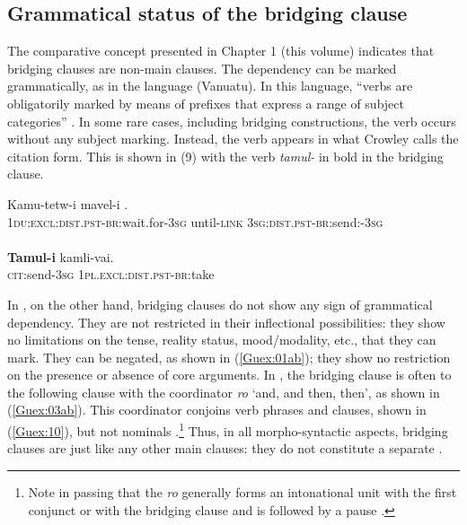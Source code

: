 \documentclass[output=paper]{LSP/langsci}
\begin{document}
\subsection{Grammatical status of the bridging clause} 
\label{Gusec:Status}
The comparative concept presented in Chapter 1 (this volume) indicates that bridging clauses are non-main clauses. The dependency can be marked grammatically, as in the  language  (Vanuatu). In this language, ``verbs are obligatorily marked by means of prefixes that express a range of subject categories'' \citep[][85]{crowley98}. In some rare cases, including bridging constructions, the verb occurs without any subject marking. Instead, the verb appears in what Crowley calls the citation form. This is shown in (9) with the verb \textit{tamul-} in bold in the bridging clause. 

\begin{exe}
	\ex	\label{Guex:9ab}
	\begin{xlist}
\ex	\label{Guex:9a}
		\gll	 Kamu-tetw-i   mavel-i \underline{}.\\
			\textsc{1du:excl:dist.pst-br}:wait.for-\textsc{3sg} 	until-\textsc{link} \textsc{3sg:dist.pst-br}:send:-\textsc{3sg}\\
		\glt	{}\\
\ex	\label{Guex:9b}
		\gll	\textbf{Tamul-i} kamli-vai.\\
			\textsc{cit}:send-\textsc{3sg} \textsc{1pl.excl:dist.pst-br}:take \\
		\glt	{} \citep [][118]{crowley98}
	\end{xlist}
\end{exe}

In , on the other hand, bridging clauses do not show any sign of grammatical dependency. They are not restricted in their inflectional possibilities: they show no limitations on the tense, reality status, mood/modality, etc., that they can mark. They can be negated, as shown in (\ref{Guex:01ab}); they show no restriction on the presence or absence of core arguments. In , the bridging clause is often  to the following clause with the coordinator \textit{ro} `and, and then, then', as shown in (\ref{Guex:03ab}). This coordinator conjoins verb phrases and clauses, shown in (\ref{Guex:10}), but not nominals \citep[][314ff]{guerin11}.\footnote{Note in passing that the  \textit{ro} generally forms an intonational unit with the first conjunct or with the bridging clause and is followed by a pause \citep[][321]{guerin11}.} Thus, in all morpho-syntactic aspects, bridging clauses are just like any other main clauses: they do not constitute a separate .  
\end{document}
